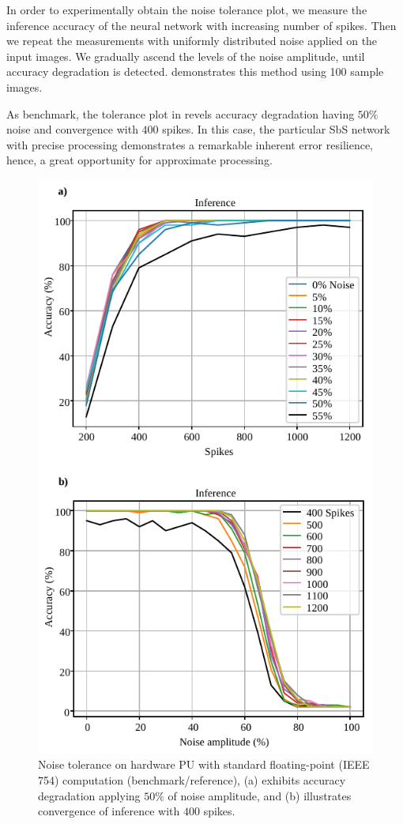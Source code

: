 In order to experimentally obtain the noise tolerance plot, we measure the inference accuracy of the neural network with increasing number of spikes. Then we repeat the measurements with uniformly distributed noise applied on the input images. We gradually ascend the levels of the noise amplitude, until accuracy degradation is detected.  demonstrates this method using 100 sample images.

As benchmark, the tolerance plot in  revels accuracy degradation having $50\%$ noise and convergence with $400$ spikes. In this case, the particular SbS network with precise processing demonstrates a remarkable inherent error resilience, hence, a great opportunity for approximate processing.


\begin{figure}[t!]
	\centering
	\includegraphics[width=1\columnwidth]{../figures/accuracy_vs_noise_pu_fp.pdf}
	\caption{Noise tolerance on hardware PU with standard floating-point (IEEE 754) computation (benchmark/reference), (a) exhibits accuracy degradation applying $50\%$ of noise amplitude, and (b) illustrates convergence of inference with $400$ spikes.}
	\label{fig:accuracy_vs_noise_pu_fp}
\end{figure}

